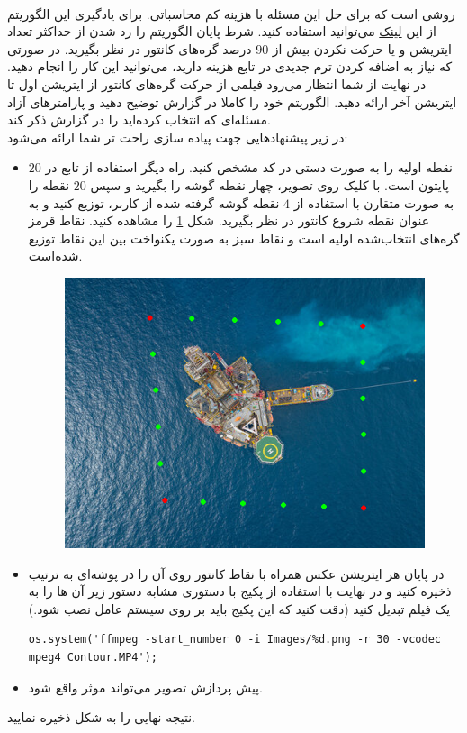 \documentclass[a4paper]{article}
\begin{document}
 \\
روشی است که برای حل این مسئله با هزینه کم محاسباتی. برای یادگیری این الگوریتم از این 
\href{URL}{لینک}
می‌توانید استفاده کنید. 
شرط پایان الگوریتم را رد شدن از حداکثر تعداد ایتریشن و یا حرکت نکردن بیش از $ 90 $ درصد گره‌های کانتور در نظر بگیرید. در صورتی که نیاز به اضافه کردن ترم جدیدی در تابع هزینه دارید، می‌توانید این کار را انجام دهید. در نهایت از شما انتظار می‌رود فیلمی از حرکت گره‌های کانتور از ایتریشن اول تا ایتریشن آخر ارائه دهید. الگوریتم خود را کاملا در گزارش توضیح دهید و پارامتر‌های آزاد مسئله‌ای که انتخاب کرده‌اید را در گزارش ذکر کند.
\\
در زیر پیشنهاد‌هایی جهت پیاده سازی راحت تر شما ارائه می‌شود:
\begin{itemize}
	\item 
$ 20 $ نقطه اولیه را به صورت دستی در کد مشخص کنید. راه دیگر استفاده  از تابع
در پایتون است. با کلیک روی تصویر، چهار نقطه گوشه را بگیرید و سپس $ 20 $ نقطه را به صورت متقارن با استفاده از $ 4 $ نقطه گوشه گرفته شده از کاربر، توزیع کنید و به عنوان نقطه شروع کانتور در نظر بگیرید. شکل 
\ref{5}
را مشاهده کنید. نقاط قرمز گره‌های انتخاب‌شده اولیه است و نقاط سبز به صورت یکنواخت بین این نقاط توزیع شده‌است. 
\begin{figure}[H]
	\centering
	\includegraphics[width=.6\linewidth]{q3-4}
	\caption{}
	\label{5}
\end{figure}
\item
در پایان هر ایتریشن عکس همراه با نقاط کانتور روی آن را در پوشه‌ای به ترتیب ذخیره کنید و در نهایت با استفاده از پکیج
 با دستوری مشابه دستور زیر آن ها را به یک فیلم تبدیل کنید (دقت کنید که این پکیج باید بر روی سیستم عامل نصب شود.)
\begin{latin}\small
	\begin{lstlisting}
os.system('ffmpeg -start_number 0 -i Images/%d.png -r 30 -vcodec mpeg4 Contour.MP4');
	\end{lstlisting}
\end{latin} 
\item
پیش پردازش تصویر می‌تواند موثر واقع شود. 
\end{itemize}
نتیجه نهایی را به شکل 
ذخیره نمایید. 
\end{document}
